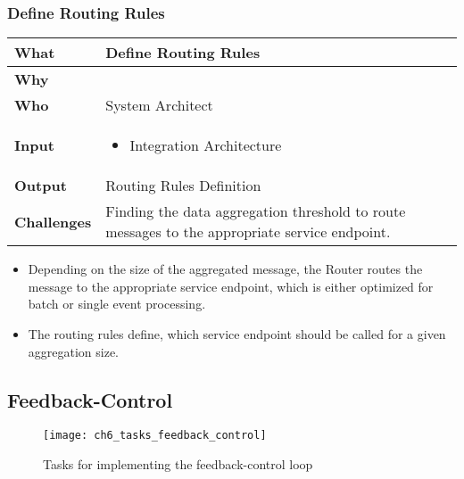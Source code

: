 \subsubsection{Define Routing Rules}

\begin{minipage}{\textwidth}
 \label{table:ch6_Task_Define_Routing_Rules}
\begin{tabular}
	{|m{3cm}|m{10cm}|} \hline \bfseries What & Define Routing Rules\\
	\hline \bfseries Why & \\
	\hline \bfseries Who & System Architect\\
	\hline \bfseries Input & 
		\begin{itemize}
			\item Integration Architecture
		\end{itemize}
	\\
	\hline \bfseries Output & Routing Rules Definition\\
	\hline \bfseries Challenges & Finding the data aggregation threshold to route messages to the appropriate service endpoint.\\
	\hline 
\end{tabular}
\end{minipage}

\begin{itemize}
	\item Depending on the size of the aggregated message, the Router routes the message to the appropriate service endpoint, which is either optimized for batch or single event processing.
	\item The routing rules define, which service endpoint should be called for a given aggregation size.
\end{itemize}

\subsection{Feedback-Control}

\begin{figure}[htpb] \centering 
	\texttt{[image: ch6\_tasks\_feedback\_control]} 
	\caption{Tasks for implementing the feedback-control loop} 
	\label{fig:ch6_tasks_feedback_control} 
\end{figure}

